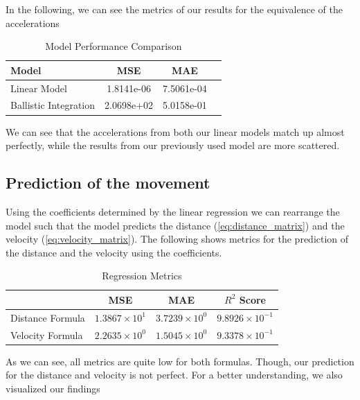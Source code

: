 In the following, we can see the metrics of our results for the equivalence of the accelerations

\begin{table}[htbp]
\centering
\caption{Model Performance Comparison}
\label{tab:model_comparison_lin_v_bal}
\begin{tabular}{lccc}
\toprule
Model & MSE & MAE \\
\midrule
Linear Model & 1.8141e-06 & 7.5061e-04 \\
Ballistic Integration & 2.0698e+02 & 5.0158e-01 \\
\bottomrule
\end{tabular}
\end{table}

We can see that the accelerations from both our linear models match up almost perfectly, while the 
results from our previously used model are more scattered. 

\subsection{Prediction of the movement}
Using the coefficients determined by the linear regression we can rearrange the model such that the model predicts 
the distance (\ref{eq:distance_matrix}) and the velocity (\ref{eq:velocity_matrix}).
The following shows metrics for the prediction of the distance and the velocity using the coefficients.

\begin{table}[h]
    \centering
    \caption{Regression Metrics}
    \begin{tabular}{lccc}
    \toprule
 & {MSE} & {MAE} & {$R^2$ Score} \\
    \midrule
    Distance Formula & $1.3867 \times 10^{1}$ & $3.7239 \times 10^{0}$ & $9.8926 \times 10^{-1}$ \\
    Velocity Formula & $2.2635 \times 10^{0}$ & $1.5045 \times 10^{0}$ & $9.3378 \times 10^{-1}$ \\
    \bottomrule
    \end{tabular}
    \label{tab:regression_metrics}
\end{table}


As we can see, all metrics are quite low for both formulas. 
Though, our prediction for the distance and velocity is not perfect. 
For a better understanding, we also visualized our findings

